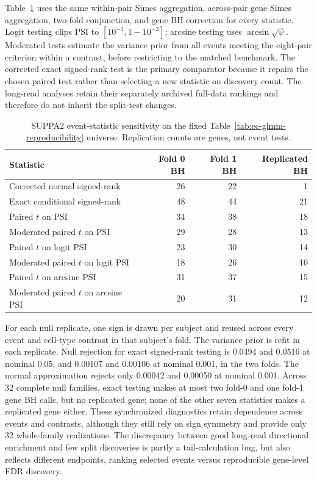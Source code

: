 \documentclass[11pt]{article}
\begin{document}
Table~\ref{tab:suppa-statistic-sensitivity} uses the same within-pair Simes aggregation, across-pair gene Simes aggregation, two-fold conjunction, and gene BH correction for every statistic. Logit testing clips PSI to \([10^{-3},1-10^{-3}]\); arcsine testing uses \(\arcsin\sqrt\psi\). Moderated tests estimate the variance prior from all events meeting the eight-pair criterion within a contrast, before restricting to the matched benchmark. The corrected exact signed-rank test is the primary comparator because it repairs the chosen paired test rather than selecting a new statistic on discovery count. The long-read analyses retain their separately archived full-data rankings and therefore do not inherit the split-test changes.

\begin{table}[H]
\centering
\small
\caption{SUPPA2 event-statistic sensitivity on the fixed Table~\ref{tab:ec-glmm-reproducibility} universe. Replication counts are genes, not event tests.}
\label{tab:suppa-statistic-sensitivity}
\begin{tabular}{lrrr}
\toprule
Statistic & Fold 0 BH & Fold 1 BH & Replicated BH\\
\midrule
Corrected normal signed-rank & 26 & 22 & 1\\
Exact conditional signed-rank & 48 & 44 & 21\\
Paired $t$ on PSI & 34 & 38 & 18\\
Moderated paired $t$ on PSI & 29 & 28 & 13\\
Paired $t$ on logit PSI & 23 & 30 & 14\\
Moderated paired $t$ on logit PSI & 18 & 26 & 10\\
Paired $t$ on arcsine PSI & 31 & 37 & 15\\
Moderated paired $t$ on arcsine PSI & 20 & 31 & 12\\
\bottomrule
\end{tabular}
\end{table}

For each null replicate, one sign is drawn per subject and reused across every event and cell-type contrast in that subject's fold. The variance prior is refit in each replicate. Null rejection for exact signed-rank testing is 0.0494 and 0.0516 at nominal 0.05, and 0.00107 and 0.00106 at nominal 0.001, in the two folds. The normal approximation rejects only 0.00042 and 0.00050 at nominal 0.001. Across 32 complete null families, exact testing makes at most two fold-0 and one fold-1 gene BH calls, but no replicated gene; none of the other seven statistics makes a replicated gene either. These synchronized diagnostics retain dependence across events and contrasts, although they still rely on sign symmetry and provide only 32 whole-family realizations. The discrepancy between good long-read directional enrichment and few split discoveries is partly a tail-calculation bug, but also reflects different endpoints, ranking selected events versus reproducible gene-level FDR discovery.
\end{document}
